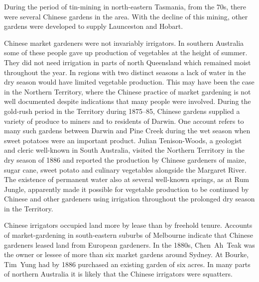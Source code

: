 During the period of tin-mining in north-eastern Tasmania,
 from the 70s, there were several Chinese
 gardens in the area.  With the decline of this mining,
other gardens were developed to supply Launceston  and Hobart.

Chinese market gardeners were not invariably irrigators.  In southern
Australia some of these people gave up production of vegetables at the
height of summer.  They did not need irrigation in parts of north
Queensland  which remained moist throughout the
year.  In regions with two distinct seasons a lack of water in the dry
season would have limited vegetable production.  This may have been
the case in the Northern Territory,  where
the Chinese practice of market gardening is not well documented
despite indications that many people were involved.  During the
gold-rush period in the Territory during 1875--85, Chinese gardens
supplied a variety of produce to miners and to residents of Darwin.
One account refers to many such gardens between Darwin  and Pine Creek  during the wet season when sweet
potatoes were an important product.  Julian Tenison-Woods,
 a geologist and cleric well-known in South
Australia, visited the Northern Territory in the dry season of 1886
and reported the production by Chinese gardeners of
maize, sugar cane, sweet potato and
culinary vegetables alongside the Margaret
River.  The existence of permanent water also at
several well-known springs, as at Rum Jungle, 
apparently made it possible for vegetable production to be continued
by Chinese and other gardeners using irrigation throughout the
prolonged dry season in the Territory.

Chinese  irrigators occupied land more by lease than by
freehold ten\-ure.  Accounts of market-gardening in south-eastern
suburbs of Melbourne  indicate that Chinese
gardeners leased land from European gardeners.  In
the 1880s, Chen~Ah~Teak  was the owner or lessee
of more than six market gardens around Sydney.  At Bourke, Tim~Yung
 had by 1886 purchased an existing garden of six
acres.  In many parts of northern Australia it is likely that the
Chinese irrigators were
squatters.

